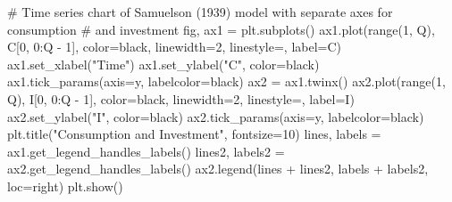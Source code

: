 \documentclass[
  letterpaper,
  DIV=11,
  numbers=noendperiod]{scrreprt}
\newenvironment{Shaded}{\begin{snugshade}}{\end{snugshade}}
\newcommand{\BuiltInTok}[1]{\textcolor[rgb]{0.00,0.23,0.31}{#1}}
\newcommand{\CommentTok}[1]{\textcolor[rgb]{0.37,0.37,0.37}{#1}}
\newcommand{\DecValTok}[1]{\textcolor[rgb]{0.68,0.00,0.00}{#1}}
\newcommand{\NormalTok}[1]{\textcolor[rgb]{0.00,0.23,0.31}{#1}}
\newcommand{\OperatorTok}[1]{\textcolor[rgb]{0.37,0.37,0.37}{#1}}
\newcommand{\StringTok}[1]{\textcolor[rgb]{0.13,0.47,0.30}{#1}}
\begin{document}
\begin{tcolorbox}
\begin{Shaded}
\begin{Highlighting}[]
\CommentTok{\# Time series chart of Samuelson (1939) model with separate axes for consumption }
\CommentTok{\# and investment}
\NormalTok{fig, ax1 }\OperatorTok{=}\NormalTok{ plt.subplots()}
\NormalTok{ax1.plot(}\BuiltInTok{range}\NormalTok{(}\DecValTok{1}\NormalTok{, Q), C[}\DecValTok{0}\NormalTok{, }\DecValTok{0}\NormalTok{:Q }\OperatorTok{{-}} \DecValTok{1}\NormalTok{], color}\OperatorTok{=}\StringTok{\textquotesingle{}black\textquotesingle{}}\NormalTok{, linewidth}\OperatorTok{=}\DecValTok{2}\NormalTok{, linestyle}\OperatorTok{=}\StringTok{\textquotesingle{}{-}\textquotesingle{}}\NormalTok{, }
\NormalTok{         label}\OperatorTok{=}\StringTok{\textquotesingle{}C\textquotesingle{}}\NormalTok{)}
\NormalTok{ax1.set\_xlabel(}\StringTok{"Time"}\NormalTok{)}
\NormalTok{ax1.set\_ylabel(}\StringTok{"C"}\NormalTok{, color}\OperatorTok{=}\StringTok{\textquotesingle{}black\textquotesingle{}}\NormalTok{)}
\NormalTok{ax1.tick\_params(axis}\OperatorTok{=}\StringTok{\textquotesingle{}y\textquotesingle{}}\NormalTok{, labelcolor}\OperatorTok{=}\StringTok{\textquotesingle{}black\textquotesingle{}}\NormalTok{)}
\NormalTok{ax2 }\OperatorTok{=}\NormalTok{ ax1.twinx()}
\NormalTok{ax2.plot(}\BuiltInTok{range}\NormalTok{(}\DecValTok{1}\NormalTok{, Q), I[}\DecValTok{0}\NormalTok{, }\DecValTok{0}\NormalTok{:Q }\OperatorTok{{-}} \DecValTok{1}\NormalTok{], color}\OperatorTok{=}\StringTok{\textquotesingle{}black\textquotesingle{}}\NormalTok{, linewidth}\OperatorTok{=}\DecValTok{2}\NormalTok{, linestyle}\OperatorTok{=}\StringTok{\textquotesingle{}{-}{-}\textquotesingle{}}\NormalTok{,}
\NormalTok{         label}\OperatorTok{=}\StringTok{\textquotesingle{}I\textquotesingle{}}\NormalTok{)}
\NormalTok{ax2.set\_ylabel(}\StringTok{"I"}\NormalTok{, color}\OperatorTok{=}\StringTok{\textquotesingle{}black\textquotesingle{}}\NormalTok{)}
\NormalTok{ax2.tick\_params(axis}\OperatorTok{=}\StringTok{\textquotesingle{}y\textquotesingle{}}\NormalTok{, labelcolor}\OperatorTok{=}\StringTok{\textquotesingle{}black\textquotesingle{}}\NormalTok{)}
\NormalTok{plt.title(}\StringTok{"Consumption and Investment"}\NormalTok{, fontsize}\OperatorTok{=}\DecValTok{10}\NormalTok{)}
\NormalTok{lines, labels }\OperatorTok{=}\NormalTok{ ax1.get\_legend\_handles\_labels()}
\NormalTok{lines2, labels2 }\OperatorTok{=}\NormalTok{ ax2.get\_legend\_handles\_labels()}
\NormalTok{ax2.legend(lines }\OperatorTok{+}\NormalTok{ lines2, labels }\OperatorTok{+}\NormalTok{ labels2, loc}\OperatorTok{=}\StringTok{\textquotesingle{}right\textquotesingle{}}\NormalTok{)}
\NormalTok{plt.show()}
\end{Highlighting}
\end{Shaded}

\end{tcolorbox}
\end{document}
